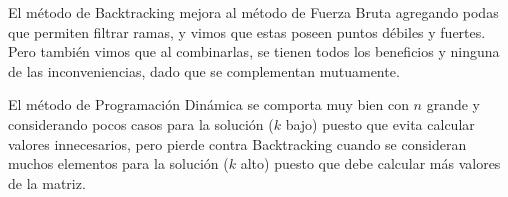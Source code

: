 \documentclass[10pt,a4paper]{article}
\begin{document}
El método de Backtracking mejora al método de Fuerza Bruta agregando podas que permiten filtrar ramas, y vimos que estas poseen puntos débiles y fuertes. Pero también vimos que al combinarlas, se tienen todos los beneficios y ninguna de las inconveniencias, dado que se complementan mutuamente.

El método de Programación Dinámica se comporta muy bien con $n$ grande y considerando pocos casos para la solución ($k$ bajo) puesto que evita calcular valores innecesarios, pero pierde contra Backtracking cuando se consideran muchos elementos para la solución ($k$ alto) puesto que debe calcular más valores de la matriz.


\newpage
\nocite{*}
\end{document}
